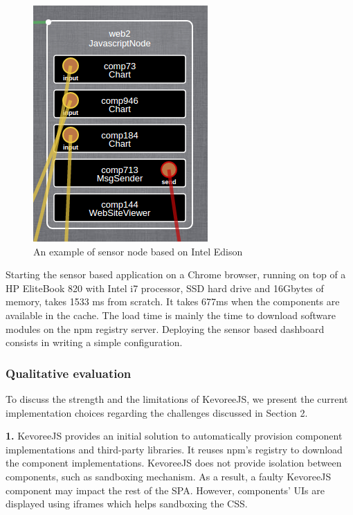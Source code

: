 \begin{figure}[t]
	\centering
	\includegraphics[width=0.5\linewidth]{figures/fig2}
	\caption{An example of sensor node based on Intel Edison}
	\label{fig:fig4}
\end{figure}


Starting the sensor based application on a Chrome browser, running on top of a HP EliteBook 820 with Intel i7 processor, SSD hard drive and 16Gbytes of memory, takes 1533 ms from scratch. It takes 677ms when the components are available in the cache. The load time is mainly the time to download software modules on the npm registry server. Deploying the sensor based dashboard consists in writing a simple configuration.


\subsubsection{Qualitative evaluation  }
To discuss the strength and the limitations of KevoreeJS, we present the current implementation choices regarding the challenges discussed in Section 2.

\indent \textbf{1.} KevoreeJS provides an initial solution to automatically provision component implementations and third-party libraries. It reuses npm's registry to download the component implementations. KevoreeJS does not provide isolation between components, such as sandboxing mechanism. As a result, a faulty KevoreeJS component may impact the rest of the SPA. However, components' UIs are displayed using iframes which helps sandboxing the CSS.

